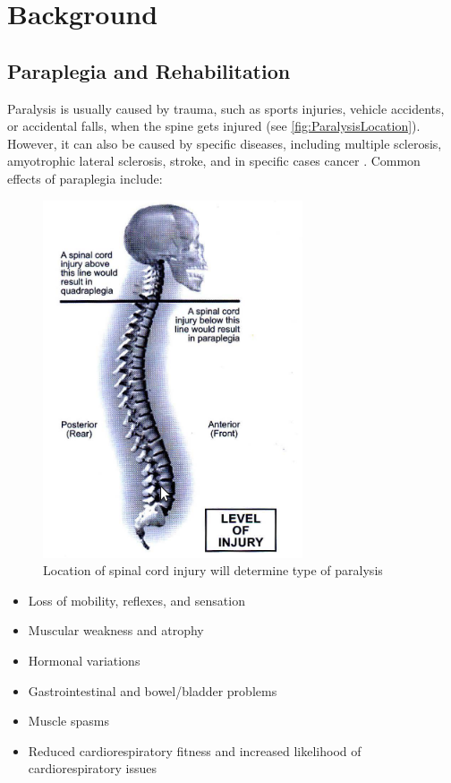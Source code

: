 \chapter{Background}

\section{Paraplegia and Rehabilitation}

Paralysis is usually caused by trauma, such as sports injuries, vehicle accidents, or accidental falls, when the spine gets injured (see \autoref{fig:ParalysisLocation}). However, it can also be caused by specific diseases, including multiple sclerosis, amyotrophic lateral sclerosis, stroke, and in specific cases cancer \cite{CausesParaplegia}. Common effects of paraplegia include:

\begin{figure} [ht!]
    \centering
    \includegraphics[width=0.5\linewidth]{Figures/Background/ParaQuadInjuryLocs.png}
    \caption{Location of spinal cord injury will determine type of paralysis \cite{RehabParaplegia}}
    \label{fig:ParalysisLocation}
\end{figure}

\begin{itemize}
    \item Loss of mobility, reflexes, and sensation
    \item Muscular weakness and atrophy
    \item Hormonal variations
    \item Gastrointestinal and bowel/bladder problems
    \item Muscle spasms
    \item Reduced cardiorespiratory fitness and increased likelihood of cardiorespiratory issues
\end{itemize}

